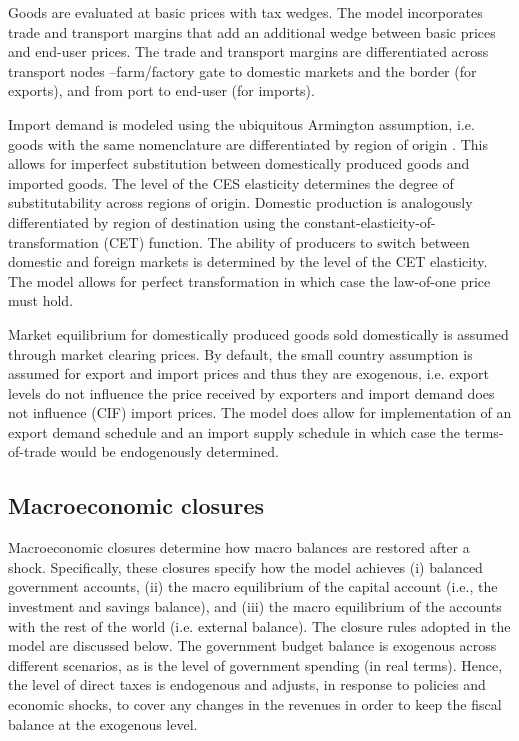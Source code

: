 \documentclass[11pt,english]{article}
\begin{document}
Goods are evaluated at basic prices with tax wedges. The model incorporates trade and transport margins that add an additional wedge between basic prices and end-user prices. The trade and transport margins are differentiated across transport nodes --farm/factory gate to domestic markets and the border (for exports), and from port to end-user (for imports).

Import demand is modeled using the ubiquitous Armington assumption, i.e. goods with the same nomenclature are differentiated by region of origin \citep{Armington_1969}. This allows for imperfect substitution between domestically produced goods and imported goods. The level of the CES elasticity determines the degree of substitutability across regions of origin. Domestic production is analogously differentiated by region of destination using the constant-elasticity-of-transformation (CET) function. The ability of producers to switch between domestic and foreign markets is determined by the level of the CET elasticity. The model allows for perfect transformation in which case the law-of-one price must hold.

Market equilibrium for domestically produced goods sold domestically is assumed through market clearing prices. By default, the small country assumption is assumed for export and import prices and thus they are exogenous, i.e. export levels do not influence the price received by exporters and import demand does not influence (CIF) import prices. The model does allow for implementation of an export demand schedule and an import supply schedule in which case the terms-of-trade would be endogenously determined.

\subsection{Macroeconomic closures}

Macroeconomic closures determine how macro balances are restored after a shock. Specifically, these closures specify how the model achieves (i) balanced government accounts, (ii) the macro equilibrium of the capital account (i.e., the investment and savings balance), and (iii) the macro equilibrium of the accounts with the rest of the world (i.e. external balance). The closure rules adopted in the model are discussed below. The government budget balance is exogenous across different scenarios, as is the level of government spending (in real terms). Hence, the level of direct taxes is endogenous and adjusts, in response to policies and economic shocks, to cover any changes in the revenues in order to keep the fiscal balance at the exogenous level.
 
\end{document}

